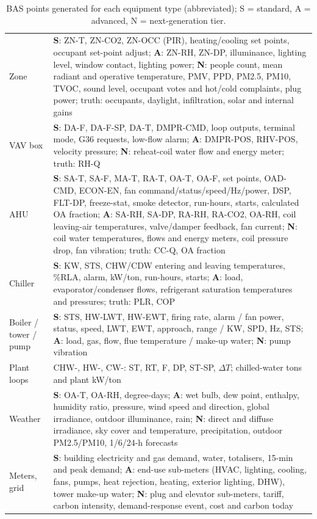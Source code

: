 \documentclass[preprint,12pt,authoryear=false]{elsarticle}
\begin{document}
\begin{table}[!htbp]
\centering\footnotesize
\caption{BAS points generated for each equipment type (abbreviated); S = standard, A = advanced, N = next-generation tier.}
\label{tab:points}
\begin{tabularx}{\linewidth}{lX}
\toprule
Zone & \textbf{S}: ZN-T, ZN-CO2, ZN-OCC (PIR), heating/cooling set points, occupant set-point adjust; \textbf{A}: ZN-RH, ZN-DP, illuminance, lighting level, window contact, lighting power; \textbf{N}: people count, mean radiant and operative temperature, PMV, PPD, PM2.5, PM10, TVOC, sound level, occupant votes and hot/cold complaints, plug power; truth: occupants, daylight, infiltration, solar and internal gains \\
VAV box & \textbf{S}: DA-F, DA-F-SP, DA-T, DMPR-CMD, loop outputs, terminal mode, G36 requests, low-flow alarm; \textbf{A}: DMPR-POS, RHV-POS, velocity pressure; \textbf{N}: reheat-coil water flow and energy meter; truth: RH-Q \\
AHU & \textbf{S}: SA-T, SA-F, MA-T, RA-T, OA-T, OA-F, set points, OAD-CMD, ECON-EN, fan command/status/speed/Hz/power, DSP, FLT-DP, freeze-stat, smoke detector, run-hours, starts, calculated OA fraction; \textbf{A}: SA-RH, SA-DP, RA-RH, RA-CO2, OA-RH, coil leaving-air temperatures, valve/damper feedback, fan current; \textbf{N}: coil water temperatures, flows and energy meters, coil pressure drop, fan vibration; truth: CC-Q, OA fraction \\
Chiller & \textbf{S}: KW, STS, CHW/CDW entering and leaving temperatures, \%RLA, alarm, kW/ton, run-hours, starts; \textbf{A}: load, evaporator/condenser flows, refrigerant saturation temperatures and pressures; truth: PLR, COP \\
Boiler / tower / pump & \textbf{S}: STS, HW-LWT, HW-EWT, firing rate, alarm / fan power, status, speed, LWT, EWT, approach, range / KW, SPD, Hz, STS; \textbf{A}: load, gas, flow, flue temperature / make-up water; \textbf{N}: pump vibration \\
Plant loops & CHW-, HW-, CW-: ST, RT, F, DP, ST-SP, $\Delta T$; chilled-water tons and plant kW/ton \\
Weather & \textbf{S}: OA-T, OA-RH, degree-days; \textbf{A}: wet bulb, dew point, enthalpy, humidity ratio, pressure, wind speed and direction, global irradiance, outdoor illuminance, rain; \textbf{N}: direct and diffuse irradiance, sky cover and temperature, precipitation, outdoor PM2.5/PM10, 1/6/24-h forecasts \\
Meters, grid & \textbf{S}: building electricity and gas demand, water, totalisers, 15-min and peak demand; \textbf{A}: end-use sub-meters (HVAC, lighting, cooling, fans, pumps, heat rejection, heating, exterior lighting, DHW), tower make-up water; \textbf{N}: plug and elevator sub-meters, tariff, carbon intensity, demand-response event, cost and carbon today \\
\bottomrule
\end{tabularx}
\end{table}
\end{document}
